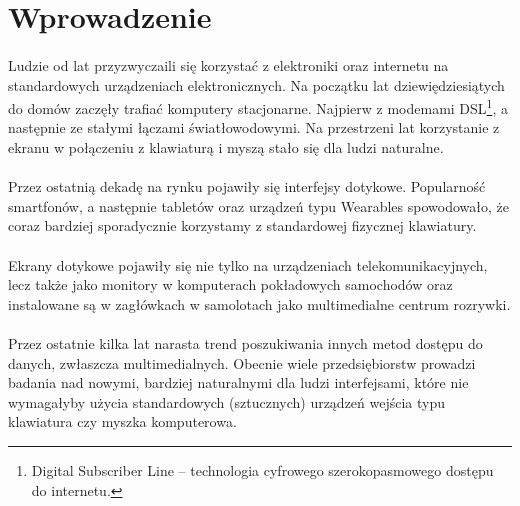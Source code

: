 \section{Wprowadzenie}
\paragraph{}
Ludzie od lat przyzwyczaili się korzystać z elektroniki oraz internetu na standardowych urządzeniach elektronicznych. Na początku lat dziewiędziesiątych do domów zaczęły trafiać komputery stacjonarne. Najpierw z modemami DSL\footnote{Digital Subscriber Line – technologia cyfrowego szerokopasmowego dostępu do internetu.}, a następnie ze stałymi łączami światłowodowymi. Na przestrzeni lat korzystanie z ekranu w połączeniu z klawiaturą i myszą stało się dla ludzi naturalne.
\paragraph{}
Przez ostatnią dekadę na rynku pojawiły się interfejsy dotykowe. Popularność smartfonów, a następnie tabletów oraz urządzeń typu Wearables\cite{wea} spowodowało, że coraz bardziej sporadycznie korzystamy z standardowej fizycznej klawiatury.
\paragraph{}
Ekrany dotykowe pojawiły się nie tylko na urządzeniach telekomunikacyjnych, lecz także jako monitory w komputerach pokładowych samochodów oraz instalowane są w zagłówkach w samolotach jako multimedialne centrum rozrywki\cite{boeing}.
\paragraph{}
Przez ostatnie kilka lat narasta trend poszukiwania innych metod dostępu do danych, zwłaszcza multimedialnych. Obecnie wiele przedsiębiorstw prowadzi badania nad nowymi, bardziej naturalnymi dla ludzi interfejsami, które nie wymagałyby użycia standardowych (sztucznych) urządzeń wejścia typu klawiatura czy myszka komputerowa.
